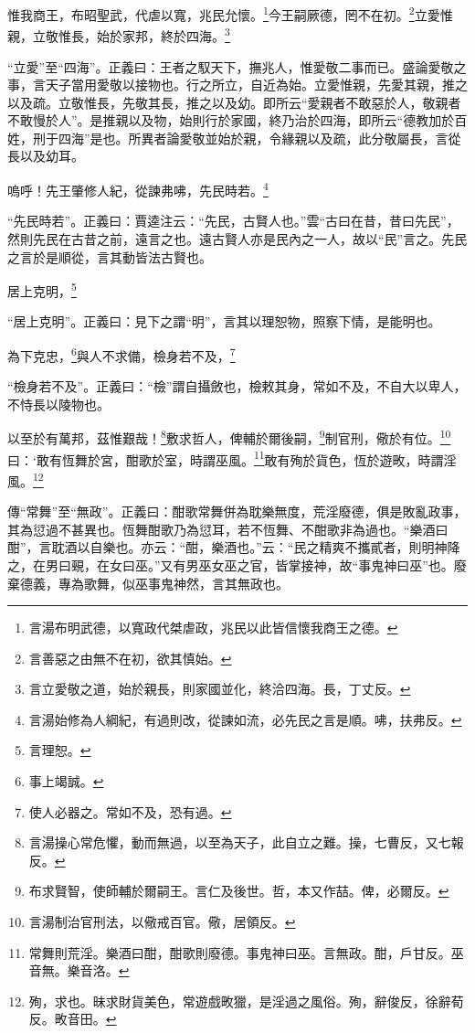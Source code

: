 惟我商王，布昭聖武，代虐以寬，兆民允懷。\footnote{言湯布明武德，以寬政代桀虐政，兆民以此皆信懷我商王之德。}今王嗣厥德，罔不在初。\footnote{言善惡之由無不在初，欲其慎始。}立愛惟親，立敬惟長，始於家邦，終於四海。\footnote{言立愛敬之道，始於親長，則家國並化，終洽四海。長，丁丈反。}

{\noindent\shu{}\fzkt “立愛”至“四海”。正義曰：王者之馭天下，撫兆人，惟愛敬二事而已。盛論愛敬之事，言天子當用愛敬以接物也。行之所立，自近為始。立愛惟親，先愛其親，推之以及疏。立敬惟長，先敬其長，推之以及幼。即所云“愛親者不敢惡於人，敬親者不敢慢於人”。是推親以及物，始則行於家國，終乃治於四海，即所云“德教加於百姓，刑于四海”是也。所異者論愛敬並始於親，令緣親以及疏，此分敬屬長，言從長以及幼耳。 \par}

嗚呼！先王肇修人紀，從諫弗咈，先民時若。\footnote{言湯始修為人綱紀，有過則改，從諫如流，必先民之言是順。咈，扶弗反。}

{\noindent\shu{}\fzkt “先民時若”。正義曰：賈逵注云：“先民，古賢人也。”雲“古曰在昔，昔曰先民”，然則先民在古昔之前，遠言之也。遠古賢人亦是民內之一人，故以“民”言之。先民之言於是順從，言其動皆法古賢也。 \par}

居上克明，\footnote{言理恕。}

{\noindent\shu{}\fzkt “居上克明”。正義曰：見下之謂“明”，言其以理恕物，照察下情，是能明也。 \par}

為下克忠，\footnote{事上竭誠。}與人不求備，檢身若不及，\footnote{使人必器之。常如不及，恐有過。}

{\noindent\shu{}\fzkt “檢身若不及”。正義曰：“檢”謂自攝斂也，檢敕其身，常如不及，不自大以卑人，不恃長以陵物也。 \par}

以至於有萬邦，茲惟艱哉！\footnote{言湯操心常危懼，動而無過，以至為天子，此自立之難。操，七曹反，又七報反。}敷求哲人，俾輔於爾後嗣，\footnote{布求賢智，使師輔於爾嗣王。言仁及後世。哲，本又作喆。俾，必爾反。}制官刑，儆於有位。\footnote{言湯制治官刑法，以儆戒百官。儆，居領反。}曰：‘敢有恆舞於宮，酣歌於室，時謂巫風。\footnote{常舞則荒淫。樂酒曰酣，酣歌則廢德。事鬼神曰巫。言無政。酣，戶甘反。巫音無。樂音洛。}敢有殉於貨色，恆於遊畋，時謂淫風。\footnote{殉，求也。昧求財貨美色，常遊戲畋獵，是淫過之風俗。殉，辭俊反，徐辭荀反。畋音田。}


{\noindent\zhuan{}\fzbyks 傳“常舞”至“無政”。正義曰：酣歌常舞併為耽樂無度，荒淫廢德，俱是敗亂政事，其為愆過不甚異也。恆舞酣歌乃為愆耳，若不恆舞、不酣歌非為過也。“樂酒曰酣”，言耽酒以自樂也。亦云：“酣，樂酒也。”云：“民之精爽不攜貳者，則明神降之，在男曰覡，在女曰巫。”又有男巫女巫之官，皆掌接神，故“事鬼神曰巫”也。廢棄德義，專為歌舞，似巫事鬼神然，言其無政也。 \par}


